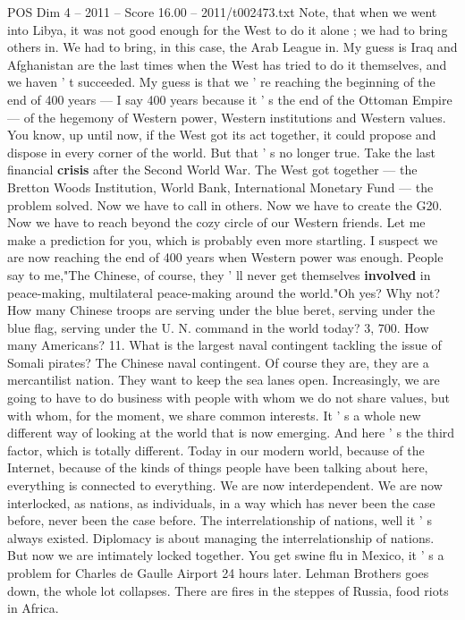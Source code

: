 \begin{textsample}{POS Dim 4 – 2011 – Score 16.00 – 2011/t002473.txt}
Note, that when we went into Libya, it was not good enough for the West to do it alone ; we had to bring others in.
We had to bring, in this case, the Arab League in.
My guess is Iraq and Afghanistan are the last times when the West has tried to do it themselves, and we haven ' t succeeded.
My guess is that we ' re reaching the beginning of the end of 400 years — I say 400 years because it ' s the end of the Ottoman Empire — of the hegemony of Western power, Western institutions and Western values.
You know, up until now, if the West got its act together, it could propose and dispose in every corner of the world.
But that ' s no longer true.
Take the last financial \textbf{crisis} after the Second World War.
The West got together — the Bretton Woods Institution, World Bank, International Monetary Fund — the problem solved.
Now we have to call in others.
Now we have to create the G20.
Now we have to reach beyond the cozy circle of our Western friends.
Let me make a prediction for you, which is probably even more startling.
I suspect we are now reaching the end of 400 years when Western power was enough.
People say to me,"The Chinese, of course, they ' ll never get themselves \textbf{involved} in peace-making, multilateral peace-making around the world."Oh yes?
Why not?
How many Chinese troops are serving under the blue beret, serving under the blue flag, serving under the U.
N. command in the world today? 3, 700.
How many Americans? 11.
What is the largest naval contingent tackling the issue of Somali pirates?
The Chinese naval contingent.
Of course they are, they are a mercantilist nation.
They want to keep the sea lanes open.
Increasingly, we are going to have to do business with people with whom we do not share values, but with whom, for the moment, we share common interests.
It ' s a whole new different way of looking at the world that is now emerging.
And here ' s the third factor, which is totally different.
Today in our modern world, because of the Internet, because of the kinds of things people have been talking about here, everything is connected to everything.
We are now interdependent.
We are now interlocked, as nations, as individuals, in a way which has never been the case before, never been the case before.
The interrelationship of nations, well it ' s always existed.
Diplomacy is about managing the interrelationship of nations.
But now we are intimately locked together.
You get swine flu in Mexico, it ' s a problem for Charles de Gaulle Airport 24 hours later.
Lehman Brothers goes down, the whole lot collapses.
There are fires in the steppes of Russia, food riots in Africa.

\end{textsample}
